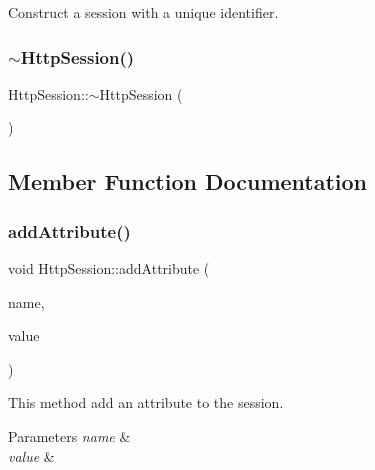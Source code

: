 Construct a session with a unique identifier. 

\mbox{\label{class_http_session_afb9e986ea06dc1cb767d3d6fbf6f420c}} 
\subsubsection{\texorpdfstring{$\sim$\+Http\+Session()}{~HttpSession()}}
{\footnotesize\ttfamily Http\+Session\+::$\sim$\+Http\+Session (\begin{DoxyParamCaption}{ }\end{DoxyParamCaption})}



\subsection{Member Function Documentation}
\mbox{\label{class_http_session_a9d7250801e2b43f61b28facf2b48c1b5}} 
\subsubsection{\texorpdfstring{add\+Attribute()}{addAttribute()}}
{\footnotesize\ttfamily void Http\+Session\+::add\+Attribute (\begin{DoxyParamCaption}\item[{const Q\+String \&}]{name,  }\item[{Q\+Object $\ast$}]{value }\end{DoxyParamCaption})}



This method add an attribute to the session. 


\begin{DoxyParams}{Parameters}
{\em name} & \\
\hline
{\em value} & \\
\hline
\end{DoxyParams}
\mbox{\label{class_http_session_acef8380ce20f3adb9d2bb9aad0ff3f46}} 
